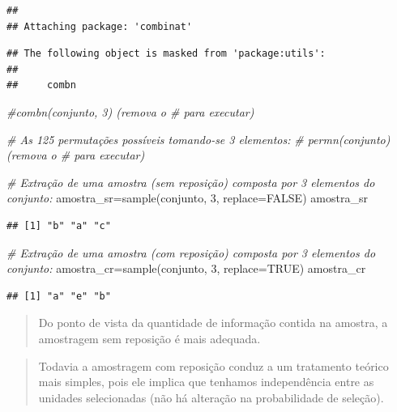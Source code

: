 \documentclass[
]{book}
\newenvironment{Shaded}{\begin{snugshade}}{\end{snugshade}}
\newcommand{\AttributeTok}[1]{\textcolor[rgb]{0.77,0.63,0.00}{#1}}
\newcommand{\CommentTok}[1]{\textcolor[rgb]{0.56,0.35,0.01}{\textit{#1}}}
\newcommand{\ConstantTok}[1]{\textcolor[rgb]{0.00,0.00,0.00}{#1}}
\newcommand{\DecValTok}[1]{\textcolor[rgb]{0.00,0.00,0.81}{#1}}
\newcommand{\FunctionTok}[1]{\textcolor[rgb]{0.00,0.00,0.00}{#1}}
\newcommand{\NormalTok}[1]{#1}
\newcommand{\OtherTok}[1]{\textcolor[rgb]{0.56,0.35,0.01}{#1}}
\begin{document}
\begin{verbatim}
## 
## Attaching package: 'combinat'
\end{verbatim}

\begin{verbatim}
## The following object is masked from 'package:utils':
## 
##     combn
\end{verbatim}

\begin{Shaded}
\begin{Highlighting}[]
\CommentTok{\#combn(conjunto, 3) (remova o \# para executar)}

\CommentTok{\# As 125 permutações possíveis tomando{-}se 3 elementos:}
\CommentTok{\# permn(conjunto) (remova o \# para executar)}

\CommentTok{\# Extração de uma amostra (sem reposição) composta por 3 elementos do conjunto:}
\NormalTok{amostra\_sr}\OtherTok{=}\FunctionTok{sample}\NormalTok{(conjunto, }\DecValTok{3}\NormalTok{, }\AttributeTok{replace=}\ConstantTok{FALSE}\NormalTok{)}
\NormalTok{amostra\_sr}
\end{Highlighting}
\end{Shaded}

\begin{verbatim}
## [1] "b" "a" "c"
\end{verbatim}

\begin{Shaded}
\begin{Highlighting}[]
\CommentTok{\# Extração de uma amostra (com reposição) composta por 3 elementos do conjunto:}
\NormalTok{amostra\_cr}\OtherTok{=}\FunctionTok{sample}\NormalTok{(conjunto, }\DecValTok{3}\NormalTok{, }\AttributeTok{replace=}\ConstantTok{TRUE}\NormalTok{)}
\NormalTok{amostra\_cr}
\end{Highlighting}
\end{Shaded}

\begin{verbatim}
## [1] "a" "e" "b"
\end{verbatim}

\hfill\break

\begin{quote}
Do ponto de vista da quantidade de informação contida na amostra, a amostragem sem reposição é mais adequada.
\end{quote}

\hfill\break

\begin{quote}
Todavia a amostragem com reposição conduz a um tratamento teórico mais simples, pois ele implica que tenhamos independência entre as unidades selecionadas (não há alteração na probabilidade de seleção).
\end{quote}
\end{document}
